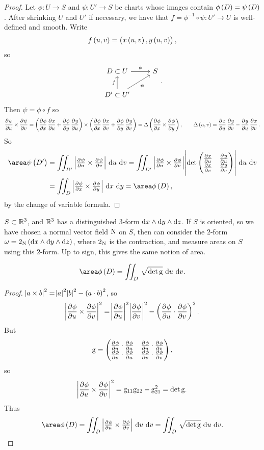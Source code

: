\begin{proof}
Let $ \phi : U \to S $ and $ \psi : U' \to S $ be charts whose images contain $ \phi\br{D} = \psi\br{D} $. After shrinking $ U $ and $ U' $ if necessary, we have that $ f = \phi^{-1} \circ \psi : U' \to U $ is well-defined and smooth. Write
$$ f\br{u, v} = \br{x\br{u, v}, y\br{u, v}}, $$
so
$$
\begin{tikzcd}
D \subset U \arrow{r}{\phi} & S \\
D' \subset U' \arrow{u}{f} \arrow[swap]{ur}{\psi} &
\end{tikzcd}.
$$
Then $ \psi = \phi \circ f $ so
$$ \dpd{\psi}{u} \times \dpd{\psi}{v} = \br{\dpd{\phi}{x}\dpd{x}{u} + \dpd{\phi}{y}\dpd{y}{u}} \times \br{\dpd{\phi}{x}\dpd{x}{v} + \dpd{\phi}{y}\dpd{y}{v}} = \Delta\br{\dpd{\phi}{x} \times \dpd{\phi}{y}}, \qquad \Delta\br{u, v} = \dpd{x}{u}\dpd{y}{v} - \dpd{y}{u}\dpd{x}{v}. $$
So
\begin{align*}
\area \psi\br{D'}
& = \iintd{D'}{\abs{\tpd{\psi}{u} \times \tpd{\psi}{v}}}{u}{v}
= \iintd{D'}{\abs{\tpd{\phi}{u} \times \tpd{\phi}{v}}\abs{\det \twobytwo{\tpd{x}{u}}{\tpd{y}{u}}{\tpd{x}{v}}{\tpd{y}{v}}}}{u}{v} \\
& = \iintd{D}{\abs{\tpd{\phi}{x} \times \tpd{\phi}{y}}}{x}{y}
= \area \phi\br{D},
\end{align*}
by the change of variable formula.
\end{proof}

\begin{note*}
$ S \subset \mathbb{R}^3 $, and $ \mathbb{R}^3 $ has a distinguished $ 3 $-form $ \mathrm{d} x \wedge \mathrm{d} y \wedge \mathrm{d} z $. If $ S $ is oriented, so we have chosen a normal vector field $ \mathrm{N} $ on $ S $, then can consider the $ 2 $-form $ \omega = 2_\N\br{\d x \wedge \d y \wedge \d z} $, where $ 2_{\mathrm{N}} $ is the contraction, and measure areas on $ S $ using this $ 2 $-form. Up to sign, this gives the same notion of area.
\end{note*}

\pagebreak

\begin{lemma}
$$ \area \phi\br{D} = \iintd{D}{\sqrt{\det \g}}{u}{v}. $$
\end{lemma}

\begin{proof}
$ \abs{a \times b}^2 = \abs{a}^2\abs{b}^2 - \br{a \cdot b}^2 $, so
$$ \abs{\dpd{\phi}{u} \times \dpd{\phi}{v}}^2 = \abs{\dpd{\phi}{u}}^2\abs{\dpd{\phi}{v}}^2 - \br{\dpd{\phi}{u} \cdot \dpd{\phi}{v}}^2. $$
But
$$ \g = \twobytwo{\tpd{\phi}{u} \cdot \tpd{\phi}{u}}{\tpd{\phi}{u} \cdot \tpd{\phi}{v}}{\tpd{\phi}{v} \cdot \tpd{\phi}{u}}{\tpd{\phi}{v} \cdot \tpd{\phi}{v}}, $$
so
$$ \abs{\dpd{\phi}{u} \times \dpd{\phi}{v}}^2 = \g_{11}\g_{22} - \g_{21}^2 = \det \g. $$
Thus
$$ \area \phi\br{D} = \iintd{D}{\abs{\tpd{\phi}{u} \times \tpd{\phi}{v}}}{u}{v} = \iintd{D}{\sqrt{\det \g}}{u}{v}. $$
\end{proof}

